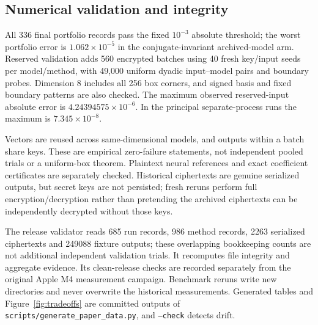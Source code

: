 \documentclass[10pt]{article}
\begin{document}
\subsection{Numerical validation and integrity}
All 336 final portfolio records pass the fixed $10^{-3}$ absolute threshold; the worst portfolio error is $1.062\times10^{-5}$ in the conjugate-invariant archived-model arm. Reserved validation adds 560 encrypted batches using 40 fresh key/input seeds per model/method, with 49,000 uniform dyadic input--model pairs and boundary probes. Dimension 8 includes all 256 box corners, and signed basis and fixed boundary patterns are also checked. The maximum observed reserved-input absolute error is $4.24394575\times10^{-6}$. In the principal separate-process runs the maximum is $7.345\times10^{-8}$.

Vectors are reused across same-dimensional models, and outputs within a batch share keys. These are empirical zero-failure statements, not independent pooled trials or a uniform-box theorem. Plaintext neural references and exact coefficient certificates are separately checked. Historical ciphertexts are genuine serialized outputs, but secret keys are not persisted; fresh reruns perform full encryption/decryption rather than pretending the archived ciphertexts can be independently decrypted without those keys.

The release validator reads 685 run records, 986 method records, 2263 serialized ciphertexts and 249088 fixture outputs; these overlapping bookkeeping counts are not additional independent validation trials. It recomputes file integrity and aggregate evidence. Its clean-release checks are recorded separately from the original Apple M4 measurement campaign. Benchmark reruns write new directories and never overwrite the historical measurements. Generated tables and Figure~\ref{fig:tradeoffs} are committed outputs of \texttt{scripts/generate\_paper\_data.py}, and \texttt{--check} detects drift.
\end{document}
